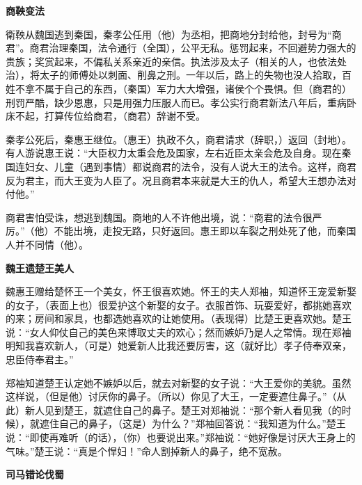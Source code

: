 \documentclass[12pt,UTF-8,openany,a4]{ctexbook}
\begin{document}
\begin{large}\yiwen
    
    \begin{center}{\Large\textbf{商鞅变法}}\end{center}
    
    衛鞅从魏国逃到秦国，秦孝公任用（他）为丞相，把商地分封给他，封号为“商君”。商君治理秦国，法令通行（全国），公平无私。惩罚起来，不回避势力强大的贵族；奖赏起来，不偏私关系亲近的亲信。执法涉及太子（相关的人，也依法处治），将太子的师傅处以刺面、削鼻之刑。一年以后，路上的失物也没人拾取，百姓不拿不属于自己的东西，（秦国）军力大大增强，诸侯个个畏惧。但（商君的）刑罚严酷，缺少恩惠，只是用强力压服人而已。孝公实行商君新法八年后，重病卧床不起，打算传位给商君，（商君）辞谢不受。
    
    秦孝公死后，秦惠王继位。（惠王）执政不久，商君请求（辞职，）返回（封地）。有人游说惠王说：“大臣权力太重会危及国家，左右近臣太亲会危及自身。现在秦国连妇女、儿童（遇到事情）都说商君的法令，没有人说大王的法令。这样，商君反为君主，而大王变为人臣了。况且商君本来就是大王的仇人，希望大王想办法对付他。”
    
    商君害怕受诛，想逃到魏国。商地的人不许他出境，说：“商君的法令很严厉。”（他）不能出境，走投无路，只好返回。惠王即以车裂之刑处死了他，而秦国人并不同情（他）。
    
    \begin{center}{\Large\textbf{魏王遗楚王美人}}\end{center}
    
    魏惠王赠给楚怀王一个美女，怀王很喜欢她。怀王的夫人郑袖，知道怀王宠爱新娶的女子，（表面上也）很爱护这个新娶的女子。衣服首饰、玩耍爱好，都挑她喜欢的来；房间和家具，也都选她喜欢的让她使用。（表现得）比楚王更喜欢她。楚王说：“女人仰仗自己的美色来博取丈夫的欢心；然而嫉妒乃是人之常情。现在郑袖明知我喜欢新人，（可是）她爱新人比我还要厉害，这（就好比）孝子侍奉双亲，忠臣侍奉君主。”
    
    郑袖知道楚王认定她不嫉妒以后，就去对新娶的女子说：“大王爱你的美貌。虽然这样说，（但是他）讨厌你的鼻子。（所以）你见了大王，一定要遮住鼻子。”（从此）新人见到楚王，就遮住自己的鼻子。楚王对郑袖说：“那个新人看见我（的时候），就遮住自己的鼻子，（这是）为什么？”郑袖回答说：“我知道为什么。”楚王说：“即使再难听（的话），（你）也要说出来。”郑袖说：“她好像是讨厌大王身上的气味。”楚王说：“真是个悍妇！”命人割掉新人的鼻子，绝不宽赦。
    
    \begin{center}{\Large\textbf{司马错论伐蜀}}\end{center}
    

\end{large}
\end{document}
